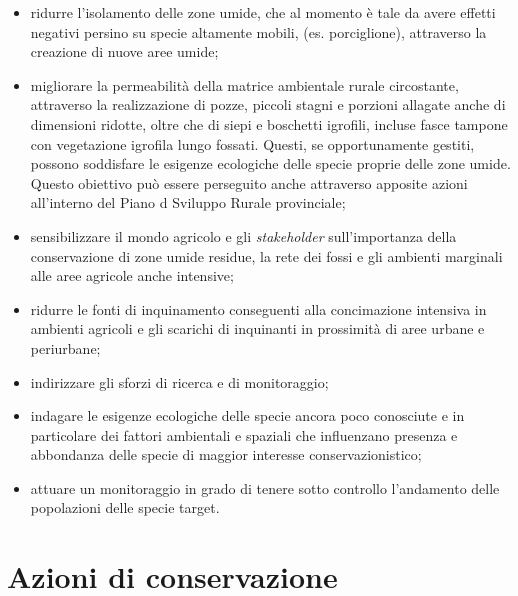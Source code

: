 \documentclass[10pt,twoside,openany,x11names,svgnames,italian,a5paper,dvipsnames,table]{memoir}
\newcommand\chapterillustration{}
\begin{document}
\begin{itemize}
  \item ridurre l'isolamento delle zone umide, che al momento è tale da avere effetti negativi persino su specie altamente mobili, (es. porciglione), attraverso la creazione di nuove aree umide;
  \item migliorare la permeabilità della matrice ambientale rurale circostante, attraverso la realizzazione di pozze, piccoli stagni e porzioni allagate anche di dimensioni ridotte, oltre che di siepi e boschetti igrofili, incluse fasce tampone con vegetazione igrofila lungo fossati. Questi, se opportunamente gestiti, possono soddisfare le esigenze ecologiche delle specie proprie delle zone umide. Questo obiettivo può essere perseguito anche attraverso apposite azioni all'interno del Piano d Sviluppo Rurale provinciale;
  \item sensibilizzare il mondo agricolo e gli \emph{stakeholder} sull'importanza della conservazione di zone umide residue, la rete dei fossi e gli ambienti marginali alle aree agricole anche intensive;
  \item ridurre le fonti di inquinamento conseguenti alla concimazione intensiva in ambienti agricoli e gli scarichi di inquinanti in prossimità di aree urbane e periurbane;
  \item indirizzare gli sforzi di ricerca e di monitoraggio;
  \item indagare le esigenze ecologiche delle specie ancora poco conosciute e in particolare dei fattori ambientali e spaziali che influenzano presenza e abbondanza delle specie di maggior interesse conservazionistico;
  \item attuare un monitoraggio in grado di tenere sotto controllo l’andamento delle popolazioni delle specie target.
\end{itemize}



  
\setlength\afterchapskip{52mm}
\chapter{Azioni di conservazione}
\renewcommand\chapterillustration{5.jpg}
\end{document}
